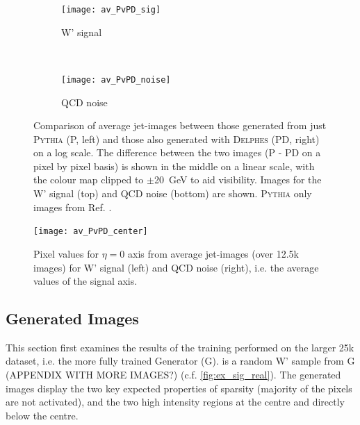 \documentclass[twocolumn,twoside]{article}
\newcommand{\pkg}[1]{\textsc{#1}}
\newcommand{\around}{{\raise.17ex\hbox{$\scriptstyle\sim$}}}
\begin{document}
  
\begin{figure}[H]
	\centering
	\begin{subfigure}[t]{1.0\linewidth}
		\centering
		\texttt{[image: av\_PvPD\_sig]}
		\caption{W' signal}
	\end{subfigure}%
	\\
	\begin{subfigure}[t]{1.0\linewidth}
		\centering
		\texttt{[image: av\_PvPD\_noise]}
		\caption{QCD noise}
	\end{subfigure}

	\caption{Comparison of average jet-images between those generated from just \pkg{Pythia} (P, left) and those also generated with \pkg{Delphes} (PD, right) on a log scale. The difference between the two images (P - PD on a pixel by pixel basis) is shown in the middle on a linear scale, with the colour map clipped to $\pm$\SI{20}{\giga\electronvolt} to aid visibility. Images for the W' signal (top) and QCD noise (bottom) are shown. \pkg{Pythia} only images from Ref. \cite{de2017learning}. }
	\label{fig:delphes_ims}
\end{figure}

\begin{figure}[H]
	\centering
	\texttt{[image: av\_PvPD\_center]}
	
	\caption{Pixel values for $\eta=0$ axis from average jet-images (over 12.5k images)  for W' signal (left) and QCD noise (right), i.e. the average values of the signal axis.}
	\label{fig:delphes_middle}
	
\end{figure} 

\subsection{Generated Images}
\label{sec:genims}

This section first examines the results of the training performed on the larger 25k dataset, i.e. the more fully trained Generator (G).  is a random W' sample from G (APPENDIX WITH MORE IMAGES?) (c.f. \cref{fig:ex_sig_real}). The generated images display the two key expected properties of sparsity (majority of the pixels are not activated), and the two high intensity regions at the centre and directly below the centre.
\end{document}
